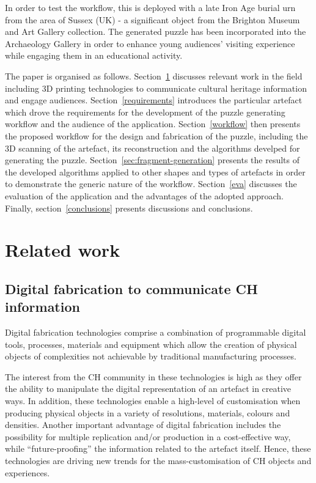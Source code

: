 \documentclass[acmlarge,screen,dvipsnames]{acmart}
\begin{document}
In order to test the workflow, this is deployed with a late Iron Age
burial urn from the area of Sussex (UK) - a significant object from
the Brighton Museum and Art Gallery collection. The generated puzzle
has been incorporated into the Archaeology Gallery in order to enhance
young audiences' visiting experience while engaging them in an
educational activity.


The paper is organised as follows. Section~\ref{related} discusses
relevant work in the field including 3D printing technologies to
communicate cultural heritage information and engage
audiences. Section~\ref{requirements} introduces the particular
artefact which drove the requirements for the development of the
puzzle generating workflow and the audience of the
application. Section~\ref{workflow} then presents the proposed
workflow for the design and fabrication of the puzzle, including the
3D scanning of the artefact, its reconstruction and the algorithms
develped for generating the
puzzle. Section~\ref{sec:fragment-generation} presents the results of
the developed algorithms applied to other shapes and types of
artefacts in order to demonstrate the generic nature of the
workflow. Section~\ref{eva} discusses the evaluation of the
application and the advantages of the adopted approach. Finally,
section~\ref{conclusions} presents discussions and conclusions.

\section{Related work}
\label{related}

\subsection{Digital fabrication to communicate CH information}

Digital fabrication technologies comprise a combination of
programmable digital tools, processes, materials and equipment which
allow the creation of physical objects of complexities not achievable
by traditional manufacturing processes.

The interest from the CH community in these technologies is high as
they offer the ability to manipulate the digital representation of an
artefact in creative ways. In addition, these technologies enable a
high-level of customisation when producing physical objects in a
variety of resolutions, materials, colours and densities. Another
important advantage of digital fabrication includes the possibility
for multiple replication and/or production in a cost-effective way,
while ``future-proofing'' the information related to the artefact
itself. Hence, these technologies are driving new trends for the
mass-customisation of CH objects and experiences.
\end{document}
